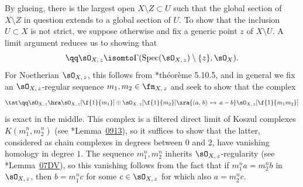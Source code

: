 By glueing, there is the largest open $X \setminus Z \subset U$ such that the global section of $X \setminus Z$ in question extends to a global section of $U$. To show that the inclusion $U \subset X$ is not strict, we suppose otherwise and fix a generic point $z$ of $X \setminus U$. A limit argument reduces us to showing that
\[
\qq \sO_{X,\, z} \isomto \Gamma(\Spec(\sO_{X,\, z}) \setminus \{ z\}, \sO_X).
\]
For Noetherian $\sO_{X,\, z}$, this follows from \cite{EGAIV2}*{th\'{e}or\`{e}me 5.10.5}, and in general we fix an $\sO_{X,\, z}$-regular sequence $m_1, m_2 \in \fm_{X,\, z}$ and seek to show that the complex
\[
\tst \qq \sO_{X,\, z} \hra \sO_{X,\, z}[\f{1}{m_1}] \oplus \sO_{X,\, z}[\f{1}{m_2}] \xra{(a,\, b)\, \mapsto\, a - b} \sO_{X,\, z}[\f{1}{m_1m_2}]
\]
is exact in the middle. This complex is a filtered direct limit of Koszul complexes $K(m_1^n, m_2^n)$ (see \cite{SP}*{Lemma~\href{https://stacks.math.columbia.edu/tag/0913}{0913}}), so it suffices to show that the latter, considered as chain complexes in degrees between $0$ and $2$, have vanishing homology in degree $1$. The sequence $m_1^n, m_2^n$ inherits $\sO_{X,\, z}$-regularity (see \cite{SP}*{Lemma~\href{https://stacks.math.columbia.edu/tag/07DV}{07DV}}), so this vanishing follows from the fact that if $m_1^n a = m_2^n b$ in $\sO_{X,\, z}$, then $b = m_1^n c$ for some $c \in \sO_{X,\, z}$ for which also $a = m_2^n c$.
 \qedhere
\eenum
\epf




